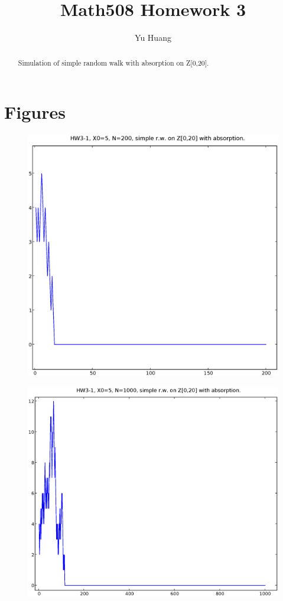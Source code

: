 \documentclass[a4paper,10pt]{article}
\title{Math508 Homework 3}
\author{Yu Huang}
\begin{document}
\maketitle

\begin{abstract}
Simulation of simple random walk with absorption on Z[0,20].
\end{abstract}

\section{Figures}
\begin{figure}[h]
\includegraphics[width=1\textwidth]{hw3_1_a_N200_X0_5.eps}
\caption{}
\end{figure}
\begin{figure}[p]
\includegraphics[width=1\textwidth]{hw3_1_a_N1000_X0_5.eps}
\caption{}
\end{figure}
\end{document}

